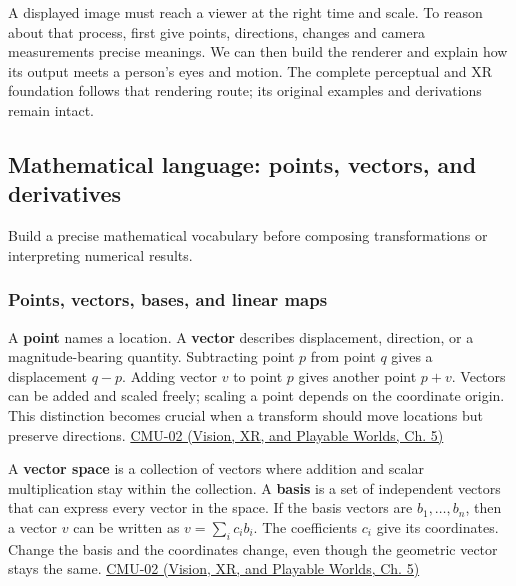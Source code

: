 \hypertarget{03-visual-computing-i-ch001-from-sampled-images-to-the-mathematics-that-makes-them-controllable}{}

A displayed image must reach a viewer at the right time and scale. To reason about that process, first give points, directions, changes and camera measurements precise meanings. We can then build the renderer and explain how its output meets a person's eyes and motion. The complete perceptual and XR foundation follows that rendering route; its original examples and derivations remain intact.

\subsection{Mathematical language: points, vectors, and derivatives}\label{03-visual-computing-i-ch001-mathematical-language-points-vectors-and-derivatives}

\hypertarget{03-visual-computing-i-ch001-mathematical-language-points-vectors-and-derivatives}{}

Build a precise mathematical vocabulary before composing transformations or interpreting numerical results.

\subsubsection{Points, vectors, bases, and linear maps}\label{03-visual-computing-i-ch001-points-vectors-bases-and-linear-maps}

\hypertarget{03-visual-computing-i-ch001-points-vectors-bases-and-linear-maps}{}

A \textbf{point} names a location. A \textbf{vector} describes displacement, direction, or a magnitude-bearing quantity. Subtracting point \(p\) from point \(q\) gives a displacement \(q-p\). Adding vector \(v\) to point \(p\) gives another point \(p+v\). Vectors can be added and scaled freely; scaling a point depends on the coordinate origin. This distinction becomes crucial when a transform should move locations but preserve directions. \href{../07-Vision-XR-and-Playable-Worlds/main.pdf\#nameddest=04-visual-computing-ii-ch036-cmu-02---linear-algebra-preview}{CMU-02 (Vision, XR, and Playable Worlds, Ch. 5)}

A \textbf{vector space} is a collection of vectors where addition and scalar multiplication stay within the collection. A \textbf{basis} is a set of independent vectors that can express every vector in the space. If the basis vectors are \(b_1,\ldots,b_n\), then a vector \(v\) can be written as \(v=\sum_i c_i b_i\). The coefficients \(c_i\) give its coordinates. Change the basis and the coordinates change, even though the geometric vector stays the same. \href{../07-Vision-XR-and-Playable-Worlds/main.pdf\#nameddest=04-visual-computing-ii-ch036-cmu-02---linear-algebra-preview}{CMU-02 (Vision, XR, and Playable Worlds, Ch. 5)}


